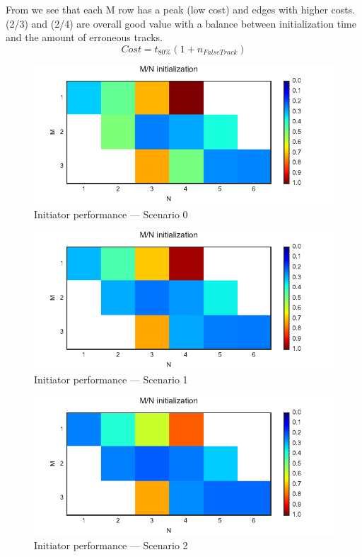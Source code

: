 From  we see that each M row has a peak (low cost) and edges with higher costs. (2/3) and (2/4) are overall good value with a balance between initialization time and the amount of erroneous tracks.
\begin{equation}\label{eq:init_score_function}
Cost = t_{80\%} (1 + n_{False Track})
\end{equation}
\begin{figure}[H]
 \centering
 \includegraphics{Figures/plots/Scenario0_Init-Performance.pdf}
 \caption{Initiator performance --- Scenario 0}\label{fig:init_performance_scenario0}
\end{figure}
\begin{figure}
 \centering
 \includegraphics{Figures/plots/Scenario1_Init-Performance.pdf}
 \caption{Initiator performance --- Scenario 1}\label{fig:init_performance_scenario1}
\end{figure}
\begin{figure}
 \centering
 \includegraphics{Figures/plots/Scenario2_Init-Performance.pdf}
 \caption{Initiator performance --- Scenario 2}\label{fig:init_performance_scenario2}
\end{figure}
